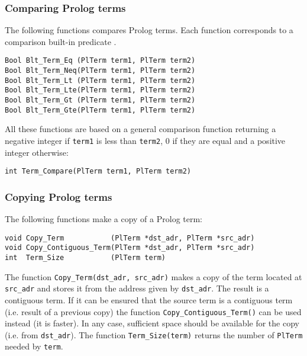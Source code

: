 \subsubsection{Comparing Prolog terms}
The following functions compares Prolog terms. Each function corresponds to
a comparison built-in predicate .

\begin{Indentation}
\begin{verbatim}
Bool Blt_Term_Eq (PlTerm term1, PlTerm term2)
Bool Blt_Term_Neq(PlTerm term1, PlTerm term2)
Bool Blt_Term_Lt (PlTerm term1, PlTerm term2)
Bool Blt_Term_Lte(PlTerm term1, PlTerm term2)
Bool Blt_Term_Gt (PlTerm term1, PlTerm term2)
Bool Blt_Term_Gte(PlTerm term1, PlTerm term2)
\end{verbatim}
\end{Indentation}

All these functions are based on a general comparison function returning a
negative integer if \texttt{term1} is less than \texttt{term2}, 0 if they
are equal and a positive integer otherwise:

\begin{Indentation}
\begin{verbatim}
int Term_Compare(PlTerm term1, PlTerm term2)
\end{verbatim}
\end{Indentation}

\subsubsection{Copying Prolog terms}
The following functions make a copy of a Prolog term:

\begin{Indentation}
\begin{verbatim}
void Copy_Term           (PlTerm *dst_adr, PlTerm *src_adr)
void Copy_Contiguous_Term(PlTerm *dst_adr, PlTerm *src_adr)
int  Term_Size           (PlTerm term)
\end{verbatim}
\end{Indentation}

The function \texttt{Copy\_Term(dst\_adr, src\_adr)} makes a copy of the
term located at \texttt{src\_adr} and stores it from the address given by
\texttt{dst\_adr}. The result is a contiguous term. If it can be ensured
that the source term is a contiguous term (i.e. result of a previous copy)
the function \texttt{Copy\_Contiguous\_Term()} can be used instead (it is
faster). In any case, sufficient space should be available for the copy
(i.e. from \texttt{dst\_adr}). The function \texttt{Term\_Size(term)}
returns the number of \texttt{PlTerm} needed by \texttt{term}.

